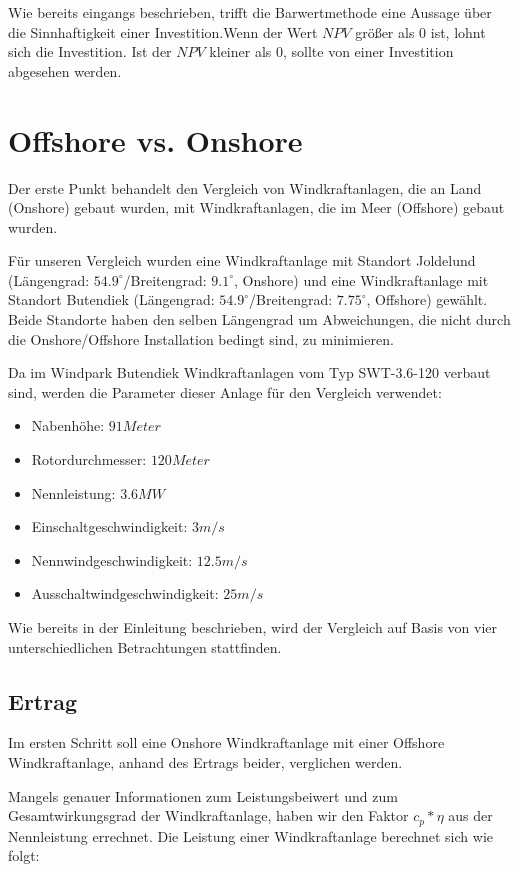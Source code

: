\documentclass[a4paper,12pt]{article}
\begin{document}
	Wie bereits eingangs beschrieben, trifft die Barwertmethode eine Aussage über die Sinnhaftigkeit einer Investition.\newline Wenn der Wert $NPV$ größer als $0$ ist, lohnt sich die Investition. Ist der $NPV$ kleiner als $0$, sollte von einer Investition abgesehen werden.
	
	\section{Offshore vs. Onshore}
	Der erste Punkt behandelt den Vergleich von Windkraftanlagen, die an Land (Onshore) gebaut wurden, mit Windkraftanlagen, die im Meer (Offshore) gebaut wurden.\\ \par
	\noindent Für unseren Vergleich wurden eine Windkraftanlage mit Standort Joldelund (Längengrad: $54.9^{\circ}$/Breitengrad: $9.1^{\circ}$, Onshore) und eine Windkraftanlage mit Standort Butendiek (Längengrad: $54.9^{\circ}$/Breitengrad: $7.75^{\circ}$, Offshore) gewählt. Beide Standorte haben den selben Längengrad um Abweichungen, die nicht durch die Onshore/Offshore Installation bedingt sind, zu minimieren.\\ \par \noindent Da im Windpark Butendiek Windkraftanlagen vom Typ SWT-3.6-120 verbaut sind, werden die Parameter dieser Anlage für den Vergleich verwendet:
	\begin{itemize}
		\item Nabenhöhe: $91 Meter$
		\item Rotordurchmesser: $120 Meter$
		\item Nennleistung: $3.6MW$
		\item Einschaltgeschwindigkeit: $3m/s$
		\item Nennwindgeschwindigkeit: $12.5m/s$
		\item Ausschaltwindgeschwindigkeit: $25m/s$
	\end{itemize}
	\noindent Wie bereits in der Einleitung beschrieben, wird der Vergleich auf Basis von vier unterschiedlichen Betrachtungen stattfinden.
	\subsection{Ertrag}
	Im ersten Schritt soll eine Onshore Windkraftanlage mit einer Offshore Windkraftanlage, anhand des Ertrags beider, verglichen werden.\\ \par
	\noindent Mangels genauer Informationen zum Leistungsbeiwert und zum Gesamtwirkungsgrad der Windkraftanlage, haben wir den Faktor $c_p * \eta$ aus der Nennleistung errechnet.\newline
	Die Leistung einer Windkraftanlage berechnet sich wie folgt:
	
\end{document}
